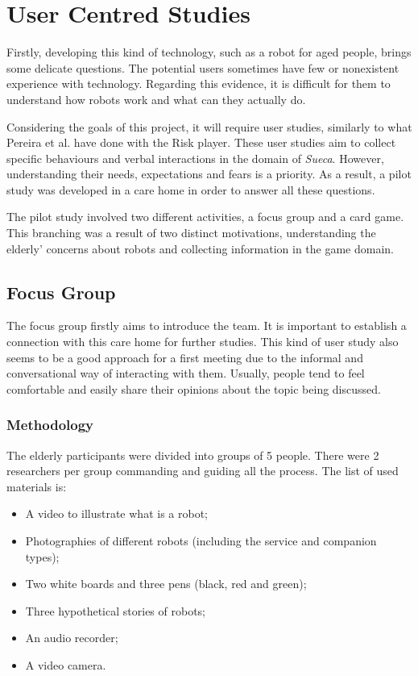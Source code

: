 \section{User Centred Studies} \label{sec:user-studies}

Firstly, developing this kind of technology, such as a robot for aged people, brings some delicate questions.
The potential users sometimes have few or nonexistent experience with technology.
Regarding this evidence, it is difficult for them to understand how robots work and what can they actually do.

Considering the goals of this project, it will require user studies, similarly to what Pereira et al. have done with the Risk player.
These user studies aim to collect specific behaviours and verbal interactions in the domain of \emph{Sueca}.
However, understanding their needs, expectations and fears is a priority. As a result, a pilot study was developed in a care home in order to answer all these questions.

The pilot study involved two different
activities, a focus group and a card game.
This branching was a result of two distinct motivations, understanding the elderly' concerns about robots and collecting information in the game domain.





\subsection{Focus Group}
The focus group firstly aims to introduce the team.
It is important to establish a connection with this care home for further studies.
This kind of user study also seems to be a good approach for a first meeting due to the informal and conversational way of interacting with them.
Usually, people tend to feel comfortable and easily share their opinions about the topic being discussed.

\subsubsection{Methodology}
The elderly participants were divided into groups of 5 people.
There were 2 researchers per group commanding and guiding all the process.
The list of used materials is:

\begin{itemize}
\item A video to illustrate what is a robot;
\item Photographies of different robots (including the service and companion types);
\item Two white boards and three pens (black, red and green);
\item Three hypothetical stories of robots;
\item An audio recorder;
\item A video camera.
\end{itemize}

